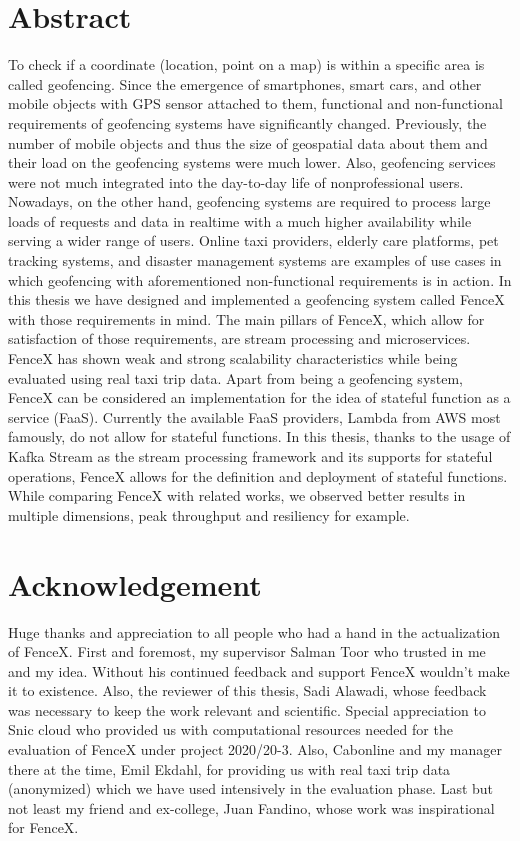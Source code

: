 \documentclass[a4]{report}
\begin{document}
    \section*{Abstract}
    To check if a coordinate (location, point on a map) is within a specific area is called geofencing.
    Since the emergence of smartphones, smart cars, and other mobile objects with GPS sensor attached to them,
    functional and non-functional requirements of geofencing systems have significantly changed.
    Previously, the number of mobile objects and thus the size of geospatial data about them and their load on the
    geofencing systems were much lower.
    Also, geofencing services were not much integrated into the day-to-day life of nonprofessional users.
    Nowadays, on the other hand, geofencing systems are required to process large loads of requests and data in
    realtime with a much higher availability while serving a wider range of users.
    Online taxi providers, elderly care platforms, pet tracking systems, and disaster management systems are examples
    of use cases in which geofencing with aforementioned non-functional requirements is in action.
    In this thesis we have designed and implemented a geofencing system called FenceX with those requirements in mind.
    The main pillars of FenceX, which allow for satisfaction of those requirements, are stream processing and
    microservices.
    FenceX has shown weak and strong scalability characteristics while being evaluated using real taxi trip data.
    Apart from being a geofencing system, FenceX can be considered an implementation for the idea of stateful function
    as a service (FaaS).
    Currently the available FaaS providers, Lambda from AWS most famously, do not allow for stateful functions.
    In this thesis, thanks to the usage of Kafka Stream as the stream processing framework and its supports for stateful
    operations, FenceX allows for the definition and deployment of stateful functions.
    While comparing FenceX with related works, we observed better results in multiple dimensions, peak throughput
    and resiliency for example.

    \section*{Acknowledgement}
    Huge thanks and appreciation to all people who had a hand in the actualization of FenceX.
    First and foremost, my supervisor Salman Toor who trusted in me and my idea.
    Without his continued feedback and support FenceX wouldn't make it to existence.
    Also, the reviewer of this thesis, Sadi Alawadi, whose feedback was necessary to keep the work relevant and
    scientific.
    Special appreciation to Snic cloud who provided us with computational resources needed for the evaluation of FenceX
    under project 2020/20-3.
    Also, Cabonline and my manager there at the time,  Emil Ekdahl, for providing us with real taxi trip data
    (anonymized) which we have used intensively in the evaluation phase.
    Last but not least my friend and ex-college, Juan Fandino, whose work was inspirational for FenceX.
\end{document}
